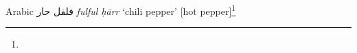 \begin{etymology}\label{ety:fulful_harr}
Arabic {فلفل حار } \textit{fulful ḥārr} `chili pepper' [hot pepper]\footnote{}
\end{etymology}